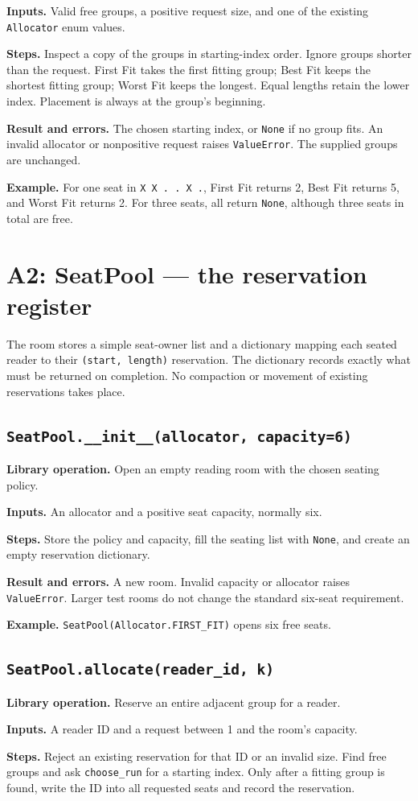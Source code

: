 \documentclass[11pt,a4paper]{article}
\newcommand{\routine}[2]{\subsection{\texorpdfstring{\texttt{#1}}{#2}}}
\newcommand{\librarymeaning}{\textbf{Library operation.} }
\newcommand{\arguments}{\textbf{Inputs.} }
\newcommand{\steps}{\textbf{Steps.} }
\newcommand{\result}{\textbf{Result and errors.} }
\newcommand{\example}{\textbf{Example.} }
\begin{document}
\arguments Valid free groups, a positive request size, and one of the
existing \texttt{Allocator} enum values.

\steps Inspect a copy of the groups in starting-index order. Ignore groups
shorter than the request. First Fit takes the first fitting group; Best Fit
keeps the shortest fitting group; Worst Fit keeps the longest. Equal lengths
retain the lower index. Placement is always at the group's beginning.

\result The chosen starting index, or \texttt{None} if no group fits.
An invalid allocator or nonpositive request raises \texttt{ValueError}.
The supplied groups are unchanged.

\example For one seat in \texttt{X X . . X .}, First Fit returns 2,
Best Fit returns 5, and Worst Fit returns 2. For three seats, all return
\texttt{None}, although three seats in total are free.

\section{A2: SeatPool --- the reservation register}

The room stores a simple seat-owner list and a dictionary mapping each
seated reader to their \texttt{(start, length)} reservation. The dictionary
records exactly what must be returned on completion. No compaction or
movement of existing reservations takes place.

\routine{SeatPool.\_\_init\_\_(allocator, capacity=6)}{SeatPool constructor}
\librarymeaning Open an empty reading room with the chosen seating policy.

\arguments An allocator and a positive seat capacity, normally six.

\steps Store the policy and capacity, fill the seating list with
\texttt{None}, and create an empty reservation dictionary.

\result A new room. Invalid capacity or allocator raises \texttt{ValueError}.
Larger test rooms do not change the standard six-seat requirement.

\example \texttt{SeatPool(Allocator.FIRST\_FIT)} opens six free seats.

\routine{SeatPool.allocate(reader\_id, k)}{SeatPool allocate}
\librarymeaning Reserve an entire adjacent group for a reader.

\arguments A reader ID and a request between 1 and the room's capacity.

\steps Reject an existing reservation for that ID or an invalid size.
Find free groups and ask \texttt{choose\_run} for a starting index. Only
after a fitting group is found, write the ID into all requested seats and
record the reservation.
\end{document}
